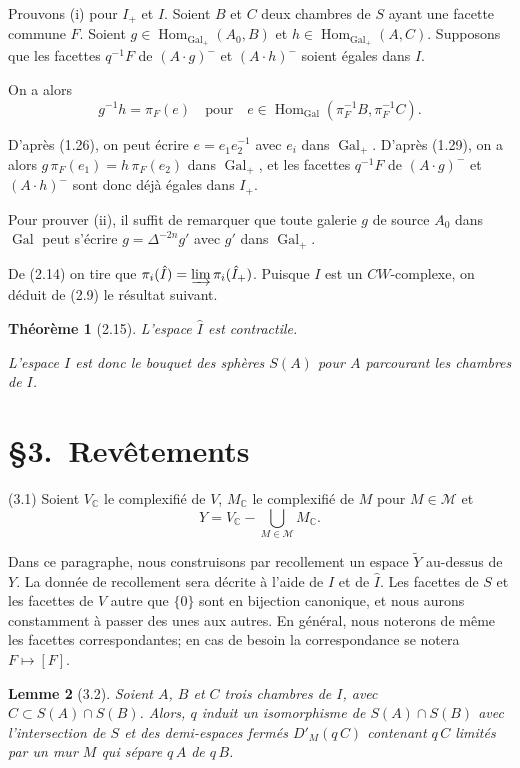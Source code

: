 \documentclass[12pt]{article}
\newtheorem{theoreme}{Théorème}
\newtheorem{lemme}[theoreme]{Lemme}
\theoremstyle{remark}
\DeclareMathOperator{\Gal}{Gal}
\DeclareMathOperator{\Hom}{Hom}
\newcommand{\CC}{\mathbb{C}}
\begin{document}
Prouvons (i) pour $I_+$ et $I$. Soient $B$ et $C$ deux chambres de $S$ ayant une facette commune $F$. Soient $g \in \Hom_{\Gal_+}(A_0, B)$ et $h \in \Hom_{\Gal_+}(A, C)$. Supposons que les facettes $q^{-1} F$ de $(A \cdot g)^-$ et $(A \cdot h)^-$ soient égales dans $I$.

On a alors
\[g^{-1} h = \pi_F(e) \quad \text{pour} \quad e \in \Hom_{\Gal}(\pi_F^{-1} B, \pi_F^{-1} C).\]

D'après (1.26), on peut écrire $e = e_1^{} e_2^{-1}$ avec $e_i$ dans $\Gal_+$. D'après (1.29), on a alors $g \, \pi_F(e_1) = h \, \pi_F(e_2)$ dans $\Gal_+$, et les facettes $q^{-1} F$ de $(A \cdot g)^-$ et $(A \cdot h)^-$ sont donc déjà égales dans $I_+$.

Pour prouver (ii), il suffit de remarquer que toute galerie $g$ de source $A_0$ dans $\Gal$ peut s'écrire $g = \Delta^{-2n} g'$ avec $g'$ dans $\Gal_+$.

De (2.14) on tire que $\pi_i(\hat{I}) = \varinjlim \pi_i(\hat{I}_+)$. Puisque $I$ est un $CW$-complexe, on déduit de (2.9) le résultat suivant.

\begin{theoreme}[2.15]
L'espace $\hat{I}$ est contractile.

L'espace $I$ est donc le bouquet des sphères $S(A)$ pour $A$ parcourant les chambres de $I$.
\end{theoreme}

\section*{\S 3.~Revêtements}

(3.1) Soient $V_\CC$ le complexifié de $V$, $M_\CC$ le complexifié de $M$ pour $M \in \mathcal{M}$ et
\[Y = V_\CC - \bigcup_{M \in \mathcal{M}} M_\CC.\]

Dans ce paragraphe, nous construisons par recollement un espace $\tilde{Y}$ au-dessus de $Y$. La donnée de recollement sera décrite à l'aide de $I$ et de $\hat{I}$. Les facettes de $S$ et les facettes de $V$ autre que $\{0\}$ sont en bijection canonique, et nous aurons constamment à passer des unes aux autres. En général, nous noterons de même les facettes correspondantes; en cas de besoin la correspondance se notera $F \mapsto [F]$.

\begin{lemme}[3.2]
Soient $A$, $B$ et $C$ trois chambres de $I$, avec $C \subset S(A) \cap S(B)$. Alors, $q$ induit un isomorphisme de $S(A) \cap S(B)$ avec l'intersection de $S$ et des demi-espaces fermés $D'_M(q \, C)$ contenant $q \, C$ limités par un mur $M$ qui sépare $q \, A$ de $q \, B$.
\end{lemme}
\end{document}
